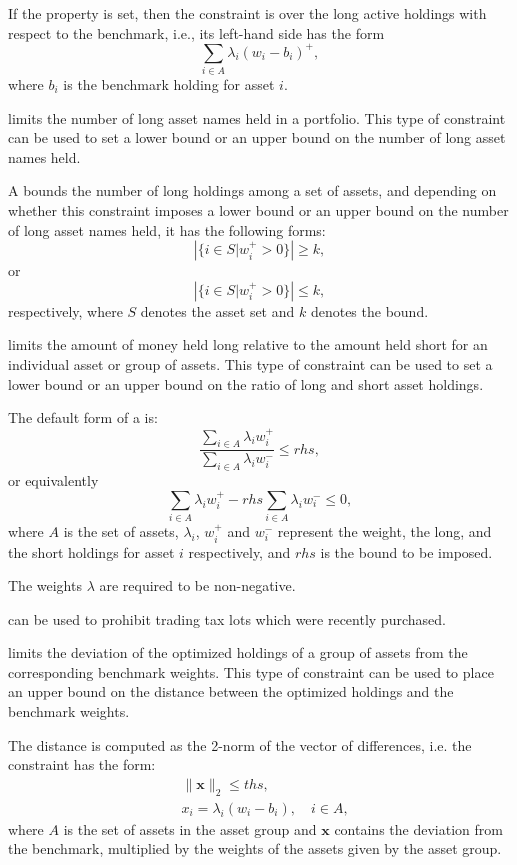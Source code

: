    If the  property is set, 
   then the constraint is over the long active holdings with respect to the benchmark, 
   i.e., its left-hand side has the form 
   \[
      \sum_{i\in A}\lambda_i (w_i-b_i)^+,
   \]
   where $b_i$ is the benchmark holding for asset $i$. 
   
   limits the number of long asset names held in a portfolio. 
   This type of constraint can be used to set a lower bound or an upper bound on the number of long asset names held. 

   A  bounds the number of long holdings among a set of assets, 
   and depending on whether this constraint imposes a lower bound or an upper bound on the number of long asset names held, 
   it has the following forms: 
   \[
      \left|\{i\in S|w_i^+>0\}\right| \ge k,
   \]
   or
   \[
      \left|\{i\in S|w_i^+>0\}\right| \le k,
   \]
   respectively, where $S$ denotes the asset set and $k$ denotes the bound. 

   limits the amount of money held long relative to the amount held short for an individual asset or group of assets.
   This type of constraint can be used to set a lower bound or an upper bound on the ratio of long and short asset holdings. 

   The default form of a  is: 
   \[
      \frac{\sum_{i\in A} \lambda_i w_i^+}{\sum_{i\in A} \lambda_i w_i^-} \le rhs,
   \]
   or equivalently
   \[
      \sum_{i\in A} \lambda_i w_i^+  - rhs \sum_{i\in A} \lambda_i w_i^- \le 0,
   \]
   where $A$ is the set of assets, $\lambda_i$, $w_i^+$ and $w_i^-$ represent the weight, the long, 
   and the short holdings for asset $i$ respectively,
   and $rhs$ is the bound to be imposed. 

   The weights $\lambda$ are required to be non-negative. 

   can be used to prohibit trading tax lots which were recently purchased. 

   limits the deviation of the optimized holdings of a group of assets from the corresponding benchmark weights. 
   This type of constraint can be used to place an upper bound on the distance between the optimized holdings and the benchmark weights. 

   The distance is computed as the 2-norm of the vector of differences, i.e. the constraint has the form: 
   \[
   \begin{split}
       &\|\mathbf{x}\|_2 \le ths,\\
       &x_i = \lambda_i(w_i - b_i), \quad i\in A,
   \end{split}
   \]
   where $A$ is the set of assets in the asset group and $\mathbf{x}$ contains the deviation from the benchmark, 
   multiplied by the weights of the assets given by the asset group. 

